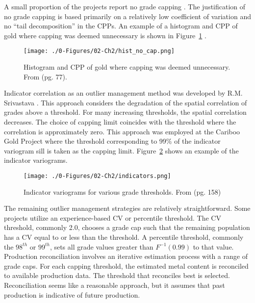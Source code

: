 A small proportion of the projects report no grade capping \citep{medgold2021,pasofino2020,eldorado2020}. The justification of no grade capping is based primarily on a relatively low coefficient of variation and no ``tail decomposition'' in the CPPs. An example of a histogram and CPP of gold where capping was deemed unnecessary is shown in Figure~\ref{fig:nocap} \citep{medgold2021}.

\begin{figure}[htb!]
     \centering
     \texttt{[image: ./0-Figures/02-Ch2/hist\_no\_cap.png]}
     \caption{Histogram and CPP of gold where capping was deemed unnecessary. From \cite{medgold2021} (pg. 77).}
     \label{fig:nocap}
 \end{figure} 

Indicator correlation as an outlier management method was developed by R.M. Srivastava \citep{leuangthong2015dealing}. This approach considers the degradation of the spatial correlation of grades above a threshold. For many increasing thresholds, the spatial correlation decreases. The choice of capping limit coincides with the threshold where the correlation is approximately zero. This approach was employed at the Cariboo Gold Project \citep{osiko2020} where the threshold corresponding to 99\% of the indicator variogram sill is taken as the capping limit. Figure~\ref{fig:indicators} shows an example of the indicator variograms.

\begin{figure}[htb!]
    \centering
    \texttt{[image: ./0-Figures/02-Ch2/indicators.png]}
    \caption{Indicator variograms for various grade thresholds. From \cite{osiko2020} (pg. 158)}
    \label{fig:indicators}
\end{figure}

The remaining outlier management strategies are relatively straightforward. Some projects utilize an experience-based CV or percentile threshold. The CV threshold, commonly 2.0, chooses a grade cap such that the remaining population has a CV equal to or less than the threshold. A percentile threshold, commonly the $98^{th}$ or $99^{th}$, sets all grade values greater than $F^{-1}(0.99)$ to that value. Production reconciliation involves an iterative estimation process with a range of grade caps. For each capping threshold, the estimated metal content is reconciled to available production data. The threshold that reconciles best is selected. Reconciliation seems like a reasonable approach, but it assumes that past production is indicative of future production.  

